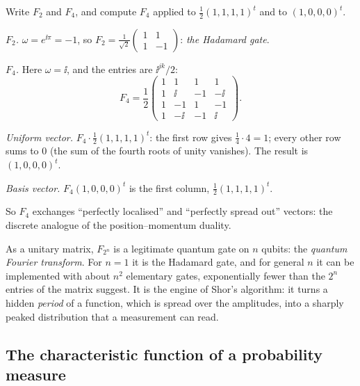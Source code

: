 \begin{example}\label{ex:dft}
  Write $F_2$ and $F_4$, and compute $F_4$ applied to $\frac12(1,1,1,1)^t$ and to $(1,0,0,0)^t$.
\end{example}
\begin{solution}
  \begin{steps}
    \item \emph{$F_2$.} $\omega=e^{\ii\pi}=-1$, so $F_2=\frac1{\sqrt2}\begin{pmatrix}1&1\\1&-1\end{pmatrix}$: \emph{the Hadamard gate}.
    \item \emph{$F_4$.} Here $\omega=\ii$, and the entries are $\ii^{jk}/2$:
      \[
        F_4=\frac12\begin{pmatrix}1&1&1&1\\1&\ii&-1&-\ii\\1&-1&1&-1\\1&-\ii&-1&\ii\end{pmatrix}.
      \]
    \item \emph{Uniform vector.} $F_4\cdot\frac12(1,1,1,1)^t$: the first row gives $\frac14\cdot4=1$; every other row sums to $0$ (the sum of the fourth roots of unity vanishes). The result is $(1,0,0,0)^t$.
    \item \emph{Basis vector.} $F_4(1,0,0,0)^t$ is the first column, $\tfrac12(1,1,1,1)^t$.
  \end{steps}
  So $F_4$ exchanges ``perfectly localised'' and ``perfectly spread out'' vectors: the discrete analogue of the position--momentum duality.
\end{solution}

\begin{lookahead}
  As a unitary matrix, $F_{2^n}$ is a legitimate quantum gate on $n$ qubits: the \emph{quantum Fourier transform}. For $n=1$ it is the Hadamard gate, and for general $n$ it can be implemented with about $n^2$ elementary gates, exponentially fewer than the $2^n$ entries of the matrix suggest. It is the engine of Shor's algorithm: it turns a hidden \emph{period} of a function, which is spread
  over the amplitudes, into a sharply peaked distribution that a measurement can read.
\end{lookahead}

\subsection{The characteristic function of a probability measure}

